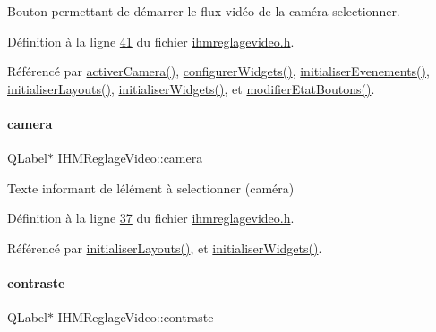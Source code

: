 Bouton permettant de démarrer le flux vidéo de la caméra selectionner. 



Définition à la ligne \hyperlink{ihmreglagevideo_8h_source_l00041}{41} du fichier \hyperlink{ihmreglagevideo_8h_source}{ihmreglagevideo.\+h}.



Référencé par \hyperlink{ihmreglagevideo_8cpp_source_l00203}{activer\+Camera()}, \hyperlink{ihmreglagevideo_8cpp_source_l00047}{configurer\+Widgets()}, \hyperlink{ihmreglagevideo_8cpp_source_l00105}{initialiser\+Evenements()}, \hyperlink{ihmreglagevideo_8cpp_source_l00061}{initialiser\+Layouts()}, \hyperlink{ihmreglagevideo_8cpp_source_l00023}{initialiser\+Widgets()}, et \hyperlink{ihmreglagevideo_8cpp_source_l00212}{modifier\+Etat\+Boutons()}.

\mbox{\label{class_i_h_m_reglage_video_a5a57047117d423ba8bf62bbcb2baee74}} 
\paragraph{\texorpdfstring{camera}{camera}}
{\footnotesize\ttfamily Q\+Label$\ast$ I\+H\+M\+Reglage\+Video\+::camera\hspace{0.3cm}{\ttfamily [private]}}



Texte informant de l\textquotesingle{}élément à selectionner (caméra) 



Définition à la ligne \hyperlink{ihmreglagevideo_8h_source_l00037}{37} du fichier \hyperlink{ihmreglagevideo_8h_source}{ihmreglagevideo.\+h}.



Référencé par \hyperlink{ihmreglagevideo_8cpp_source_l00061}{initialiser\+Layouts()}, et \hyperlink{ihmreglagevideo_8cpp_source_l00023}{initialiser\+Widgets()}.

\mbox{\label{class_i_h_m_reglage_video_ad1aa173a98ced9f3aaeccb0c2712093c}} 
\paragraph{\texorpdfstring{contraste}{contraste}}
{\footnotesize\ttfamily Q\+Label$\ast$ I\+H\+M\+Reglage\+Video\+::contraste\hspace{0.3cm}{\ttfamily [private]}}



